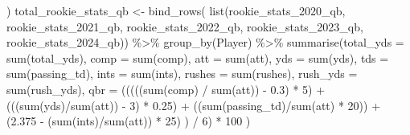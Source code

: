 \documentclass[
  letterpaper,
  DIV=11,
  numbers=noendperiod]{scrartcl}
\newenvironment{Shaded}{\begin{snugshade}}{\end{snugshade}}
\newcommand{\AttributeTok}[1]{\textcolor[rgb]{0.40,0.45,0.13}{#1}}
\newcommand{\DecValTok}[1]{\textcolor[rgb]{0.68,0.00,0.00}{#1}}
\newcommand{\FloatTok}[1]{\textcolor[rgb]{0.68,0.00,0.00}{#1}}
\newcommand{\FunctionTok}[1]{\textcolor[rgb]{0.28,0.35,0.67}{#1}}
\newcommand{\NormalTok}[1]{\textcolor[rgb]{0.00,0.23,0.31}{#1}}
\newcommand{\OtherTok}[1]{\textcolor[rgb]{0.00,0.23,0.31}{#1}}
\newcommand{\SpecialCharTok}[1]{\textcolor[rgb]{0.37,0.37,0.37}{#1}}
\begin{document}
\begin{Shaded}
\begin{Highlighting}[]
\NormalTok{  )}
\NormalTok{total\_rookie\_stats\_qb }\OtherTok{\textless{}{-}} \FunctionTok{bind\_rows}\NormalTok{(}
  \FunctionTok{list}\NormalTok{(rookie\_stats\_2020\_qb, rookie\_stats\_2021\_qb, rookie\_stats\_2022\_qb, rookie\_stats\_2023\_qb, rookie\_stats\_2024\_qb)) }\SpecialCharTok{\%\textgreater{}\%}
  \FunctionTok{group\_by}\NormalTok{(Player) }\SpecialCharTok{\%\textgreater{}\%}
  \FunctionTok{summarise}\NormalTok{(}\AttributeTok{total\_yds =} \FunctionTok{sum}\NormalTok{(total\_yds),}
            \AttributeTok{comp =} \FunctionTok{sum}\NormalTok{(comp),}
            \AttributeTok{att =} \FunctionTok{sum}\NormalTok{(att),}
            \AttributeTok{yds =} \FunctionTok{sum}\NormalTok{(yds),}
            \AttributeTok{tds =} \FunctionTok{sum}\NormalTok{(passing\_td),}
            \AttributeTok{ints =} \FunctionTok{sum}\NormalTok{(ints),}
            \AttributeTok{rushes =} \FunctionTok{sum}\NormalTok{(rushes),}
            \AttributeTok{rush\_yds =} \FunctionTok{sum}\NormalTok{(rush\_yds),}
            \AttributeTok{qbr =}\NormalTok{ (((((}\FunctionTok{sum}\NormalTok{(comp) }\SpecialCharTok{/} \FunctionTok{sum}\NormalTok{(att)) }\SpecialCharTok{{-}} \FloatTok{0.3}\NormalTok{) }\SpecialCharTok{*} \DecValTok{5}\NormalTok{) }\SpecialCharTok{+}
\NormalTok{                    (((}\FunctionTok{sum}\NormalTok{(yds)}\SpecialCharTok{/}\FunctionTok{sum}\NormalTok{(att)) }\SpecialCharTok{{-}} \DecValTok{3}\NormalTok{) }\SpecialCharTok{*} \FloatTok{0.25}\NormalTok{) }\SpecialCharTok{+}
\NormalTok{                    ((}\FunctionTok{sum}\NormalTok{(passing\_td)}\SpecialCharTok{/}\FunctionTok{sum}\NormalTok{(att) }\SpecialCharTok{*} \DecValTok{20}\NormalTok{)) }\SpecialCharTok{+}
\NormalTok{                    (}\FloatTok{2.375} \SpecialCharTok{{-}}\NormalTok{ (}\FunctionTok{sum}\NormalTok{(ints)}\SpecialCharTok{/}\FunctionTok{sum}\NormalTok{(att)) }\SpecialCharTok{*} \DecValTok{25}\NormalTok{)}
\NormalTok{                    ) }\SpecialCharTok{/} \DecValTok{6}\NormalTok{) }\SpecialCharTok{*} \DecValTok{100}
\NormalTok{  )}


\end{Highlighting}
\end{Shaded}
\end{document}

